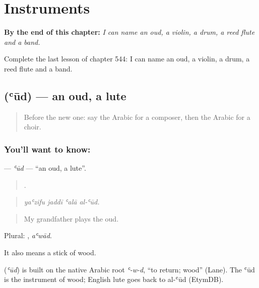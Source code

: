 
\chapter{Instruments}
\label{ch:ar-instruments}

\begin{chapteropening}
\textbf{By the end of this chapter:} \emph{I can name an oud, a violin, a drum, a reed flute and a band.}

Complete the last lesson of chapter 544: I can name an oud, a violin, a drum, a reed flute and a band.
\end{chapteropening}

\section[\texorpdfstring{\ar{عود} (ʿūd)}{عود (ʿūd)}]{ (ʿūd) — an oud, a lute}

\label{lesson:AR-C544-ud}



\begin{quote}
Before the new one: say the Arabic for a composer, then the Arabic for a choir.
\end{quote}

\subsection*{You'll want to know: }
\textbf{} — \emph{ʿūd} — \textquotedblleft{}an oud, a lute\textquotedblright{}.

\begin{quote}
   .
\end{quote}

\begin{quote}
\emph{yaʿzifu jaddī ʿalā al-ʿūd.}
\end{quote}

\begin{quote}
My grandfather plays the oud.
\end{quote}

Plural: , \emph{aʿwād}.

It also means a stick of wood.

\begin{cousinweb}
\textbf{} (\emph{ʿūd}) is built on the native Arabic root \emph{ʿ-w-d}, \textquotedblleft{}to return; wood\textquotedblright{} (Lane). The ʿūd is the instrument of wood; English lute goes back to al-ʿūd (EtymDB).
\end{cousinweb}

